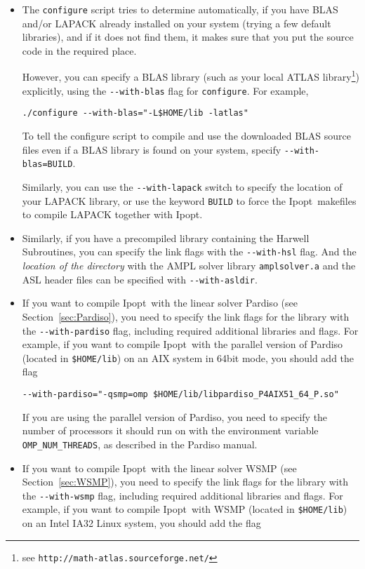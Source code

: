 \documentclass[10pt]{article}
\newcommand{\Ipopt}{{\sc Ipopt}}
\begin{document}
\begin{itemize}
\item The {\tt configure} script tries to determine automatically, if
  you have BLAS and/or LAPACK already installed on your system (trying
  a few default libraries), and if it does not find them, it makes
  sure that you put the source code in the required place.

  However, you can specify a BLAS library (such as your local ATLAS
  library\footnote{see {\tt http://math-atlas.sourceforge.net/}})
  explicitly, using the \verb/--with-blas/ flag for {\tt configure}.
  For example,

  \verb|./configure --with-blas="-L$HOME/lib -latlas"|

  To tell the configure script to compile and use the downloaded BLAS
  source files even if a BLAS library is found on your system, specify
  \verb|--with-blas=BUILD|.

  Similarly, you can use the \verb/--with-lapack/ switch to specify
  the location of your LAPACK library, or use the keyword {\tt BUILD}
  to force the \Ipopt\ makefiles to compile LAPACK together with
  \Ipopt.

\item Similarly, if you have a precompiled library containing the
  Harwell Subroutines, you can specify the link flags with the
  \verb|--with-hsl| flag.  And the \emph{location of the directory}
  with the AMPL solver library {\tt amplsolver.a} and the ASL header
  files can be specified with \verb|--with-asldir|.

\item If you want to compile \Ipopt\ with the linear solver Pardiso
  (see Section~\ref{sec:Pardiso}), you need to specify the link flags
  for the library with the \verb|--with-pardiso| flag, including
  required additional libraries and flags.  For example, if you want
  to compile \Ipopt\ with the parallel version of Pardiso (located in
  {\tt \$HOME/lib}) on an AIX system in 64bit mode, you should add the
  flag

  \verb|--with-pardiso="-qsmp=omp $HOME/lib/libpardiso_P4AIX51_64_P.so"|

  If you are using the parallel version of Pardiso, you need to
  specify the number of processors it should run on with the
  environment variable \verb|OMP_NUM_THREADS|, as described in the
  Pardiso manual.

\item If you want to compile \Ipopt\ with the linear solver WSMP (see
  Section~\ref{sec:WSMP}), you need to specify the link flags for the
  library with the \verb|--with-wsmp| flag, including required
  additional libraries and flags.  For example, if you want to compile
  \Ipopt\ with WSMP (located in {\tt \$HOME/lib}) on an Intel IA32
  Linux system, you should add the flag


\end{itemize}
\end{document}
